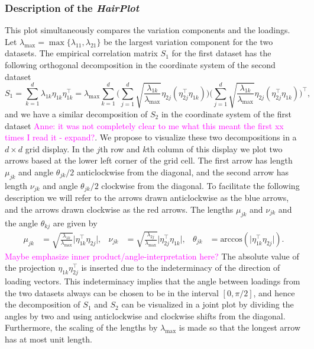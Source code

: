 \documentclass[titlepage,11pt,twoside]{article}
\newcommand{\hl}[1]{\textcolor{magenta}{#1}}
\newcommand{\acos}{\text{arccos}}
\begin{document}
\subsubsection{Description of the \emph{HairPlot}} 
This plot simultaneously compares the variation components and the loadings. Let $\lambda_{\max} = \max\{ \lambda_{11}, \lambda_{21} \}$ be the largest variation component for the two datasets. The empirical correlation matrix $S_1$ for the first dataset has the following orthogonal decomposition in the coordinate system of the second dataset
\begin{equation*}
S_1 = \sum_{k=1}^d \lambda_{1k} \eta_{1k} \eta_{1k}^\top
= \lambda_{\max} \sum_{k=1}^d
\Bigg( \sum_{j=1}^d \sqrt{\frac{\lambda_{1k}}{\lambda_{\max}}} \eta_{2j} (\eta_{2j}^\top \eta_{1k}) \Bigg)
\Bigg( \sum_{j=1}^d \sqrt{\frac{\lambda_{1k}}{\lambda_{\max}}} \eta_{2j} (\eta_{2j}^\top \eta_{1k}) \Bigg)^\top,
\end{equation*}
and we have a similar decomposition of $S_2$ in the coordinate system of the first dataset \hl{Anne: it was not completely clear to me what this meant the first xx times I read it - expand?}. We propose to visualize these two decompositions in a $d \times d$ grid display. In the $j$th row and $k$th column of this display we plot two arrows based at the lower left corner of the grid cell. The first arrow has length $\mu_{jk}$ and angle $\theta_{jk}/2$ anticlockwise from the diagonal, and the second arrow has length $\nu_{jk}$ and angle $\theta_{jk}/2$ clockwise from the diagonal. To facilitate the following description we will refer to the arrows drawn anticlockwise as the blue arrows, and the arrows drawn clockwise as the red arrows. The lengths $\mu_{jk}$ and $\nu_{jk}$ and the angle $\theta_{kj}$ are given by
\begin{align*}
\mu_{jk} &= \sqrt{\frac{\lambda_{1k}}{\lambda_{\max}}} \lvert \eta_{1k}^\top \eta_{2j} \rvert, &
\nu_{jk} &= \sqrt{\frac{\lambda_{2j}}{\lambda_{\max}}} \lvert \eta_{2j}^\top \eta_{1k} \rvert, &
\theta_{jk} &= \acos(\lvert \eta_{1k}^\top \eta_{2j} \rvert).
\end{align*}
\hl{Maybe emphasize inner product/angle-interpretation here?}
The absolute value of the projection $\eta_{1k} \eta_{2j}^\top$ is inserted due to the indeterminacy of the direction of loading vectors. This indeterminacy implies that the angle between loadings from the two datasets always can be chosen to be in the interval $[0,\pi/2]$, and hence the decomposition of $S_1$ and $S_2$ can be visualized in a joint plot by dividing the angles by two and using anticlockwise and clockwise shifts from the diagonal. Furthermore, the scaling of the lengths by $\lambda_{\max}$ is made so that the longest arrow has at most unit length.
\end{document}
